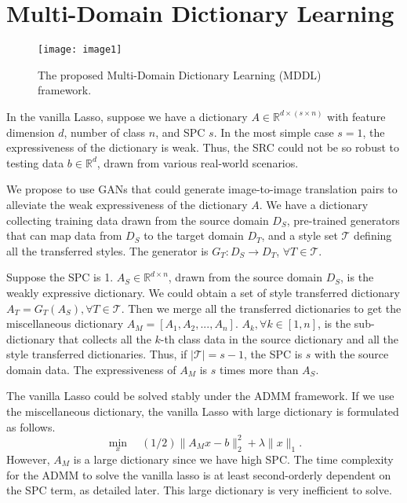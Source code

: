 \documentclass{article}
\begin{document}
\section{Multi-Domain Dictionary Learning}
\label{sec:method}

\begin{figure*}[!htb]
  \centerline{\texttt{[image: image1]}}
  \caption{The proposed Multi-Domain Dictionary Learning (MDDL) framework.}
\end{figure*}
In the vanilla Lasso, suppose we have a dictionary $A \in \mathbb{R}^{d \times (s \times n)}$ with feature dimension $d$, number of class $n$, and SPC $s$. In the most simple case $s=1$, the expressiveness of the dictionary is weak. Thus, the SRC could not be so robust to testing data $b \in \mathbb{R}^{d}$, drawn from various real-world scenarios.

We propose to use GANs that could generate image-to-image translation pairs to alleviate the weak expressiveness of the dictionary $A$. We have a dictionary collecting training data drawn from the source domain $D_{S}$, pre-trained generators that can map data from $D_{S}$ to the target domain $D_{T}$, and a style set $\mathcal{T}$ defining all the transferred styles. The generator is $G_T:D_{S} \to D_T$, $\forall T \in \mathcal{T}$.

Suppose the SPC is 1. $A_{S} \in \mathbb{R}^{d \times n}$, drawn from the source domain $D_{S}$, is the weakly expressive dictionary. We could obtain a set of style transferred dictionary $A_{T} = G_{T}(A_S), \forall T \in \mathcal{T}$. Then we merge all the transferred dictionaries to get the miscellaneous dictionary $A_M = [ A_1, A_2, ..., A_n]$. $A_k, \forall k \in [1,n]$, is the sub-dictionary that collects all the $k$-th class data in the source dictionary and all the style transferred dictionaries. Thus, if $| \mathcal{T}|=s-1$, the SPC is $s$ with the source domain data. The expressiveness of $A_M$ is $s$ times more than $A_S$.

The vanilla Lasso could be solved stably under the ADMM framework. If we use the miscellaneous dictionary, the vanilla Lasso with large dictionary is formulated as follows.
\begin{equation}
\label{v_lasso_AM}
\min_x \quad(1/2)\|A_Mx-b\|^2_2+\lambda\|x\|_1.
\end{equation}
However, $A_M$ is a large dictionary since we have high SPC. The time complexity for the ADMM to solve the vanilla lasso is at least second-orderly dependent on the SPC term, as detailed later. This large dictionary is very inefficient to solve.
\end{document}
